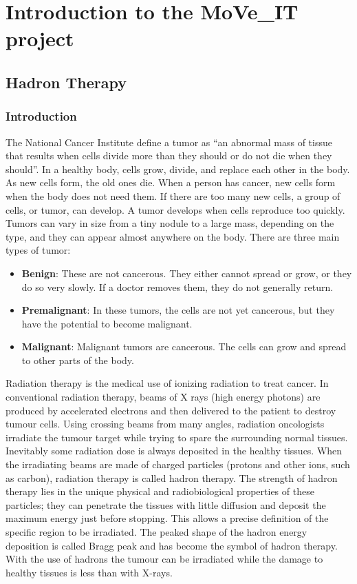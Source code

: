 \part{Introduction to the MoVe\_IT project}
\chapter{Hadron Therapy}

\section{Introduction}
The National Cancer Institute define a tumor\cite{tumor} as “an abnormal mass of tissue that results when cells divide more than they should or do not die when they should”.
In a healthy body, cells grow, divide, and replace each other in the body. As new cells form, the old ones die. When a person has cancer, new cells form when the body does not need them. If there are too many new cells, a group of cells, or tumor, can develop.
A tumor develops when cells reproduce too quickly. Tumors can vary in size from a tiny nodule to a large mass, depending on the type, and they can appear almost anywhere on the body.
There are three main types of tumor:
\begin{itemize}
\item \textbf{Benign}: These are not cancerous. They either cannot spread or grow, or they do so very slowly. If a doctor removes them, they do not generally return.
\item \textbf{Premalignant}: In these tumors, the cells are not yet cancerous, but they have the potential to become malignant.
\item \textbf{Malignant}: Malignant tumors are cancerous. The cells can grow and spread to other parts of the body.
\end{itemize}
Radiation therapy is the medical use of ionizing radiation to treat cancer. In conventional radiation therapy, beams of X rays (high energy photons) are produced by accelerated electrons and then delivered to the patient to destroy tumour cells. Using crossing beams from many angles, radiation oncologists irradiate the tumour target while trying to spare the surrounding normal tissues. Inevitably some radiation dose is always deposited in the healthy tissues.
When the irradiating beams are made of charged particles (protons and other ions, such as carbon), radiation therapy is called hadron therapy\cite{radiationtherapy}. The strength of hadron therapy lies in the unique physical and radiobiological properties of these particles; they can penetrate the tissues with little diffusion and deposit the maximum energy just before stopping. This allows a precise definition of the specific region to be irradiated. The peaked shape of the hadron energy deposition is called Bragg peak and has become the symbol of hadron therapy. With the use of hadrons the tumour can be irradiated while the damage to healthy tissues is less than with X-rays.

